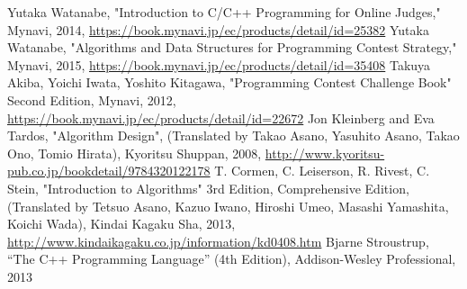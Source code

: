 \documentclass[report]{book}
\begin{document}
\appendix
 

\begin{thebibliography}{99}
  Yutaka Watanabe, "Introduction to C/C++ Programming for Online Judges," Mynavi, 2014, \url{https://book.mynavi.jp/ec/products/detail/id=25382}
 Yutaka Watanabe, "Algorithms and Data Structures for Programming Contest Strategy," Mynavi, 2015, \url{https://book.mynavi.jp/ec/products/detail/id=35408}
 Takuya Akiba, Yoichi Iwata, Yoshito Kitagawa, "Programming Contest Challenge Book" Second Edition, Mynavi, 2012, \url{https://book.mynavi.jp/ec/products/detail/id=22672}
 Jon Kleinberg and Eva Tardos, "Algorithm Design", (Translated by Takao Asano, Yasuhito Asano, Takao Ono, Tomio Hirata), Kyoritsu Shuppan, 2008, \url{http://www.kyoritsu-pub.co.jp/bookdetail/9784320122178}
 T. Cormen, C. Leiserson, R. Rivest, C. Stein, "Introduction to Algorithms" 3rd Edition, Comprehensive Edition, (Translated by Tetsuo Asano, Kazuo Iwano, Hiroshi Umeo, Masashi Yamashita, Koichi Wada), Kindai Kagaku Sha, 2013, \url{http://www.kindaikagaku.co.jp/information/kd0408.htm}
  Bjarne Stroustrup, ``The C++ Programming Language'' (4th Edition),
  Addison-Wesley Professional, 2013
\end{thebibliography}


\printindex
\end{document}
